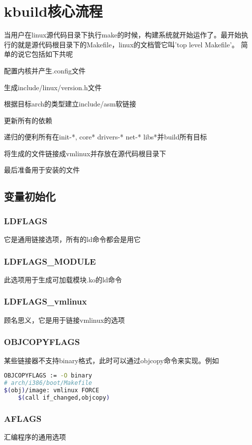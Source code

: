 \section{kbuild核心流程}
当用户在linux源代码目录下执行make的时候，构建系统就开始运作了。最开始执行的就是源代码根目录下的Makefile，linux的文档管它叫'top level Makefile'。
简单的说它包括如下共呢
\begin{compactenum}
\item 配置内核并产生.config文件
\item 生成include/linux/version.h文件
\item 根据目标arch的类型建立include/asm软链接
\item 更新所有的依赖
\item 递归的便利所有在init-*, core* drivers-* net-* libs*并build所有目标
\item 将生成的文件链接成vmlinux并存放在源代码根目录下
\item 最后准备用于安装的文件
\end{compactenum}

\subsection{变量初始化}
\subsubsection{LDFLAGS}
它是通用链接选项，所有的ld命令都会是用它
\subsubsection{LDFLAGS\_MODULE}
此选项用于生成可加载模块.ko的ld命令
\subsubsection{LDFLAGS\_vmlinux}
顾名思义，它是用于链接vmlinux的选项
\subsubsection{OBJCOPYFLAGS}
某些链接器不支持binary格式，此时可以通过objcopy命令来实现。例如
\begin{lstlisting}[language=bash]
OBJCOPYFLAGS := -O binary
# arch/i386/boot/Makefile
$(obj)/image: vmlinux FORCE
    $(call if_changed,objcopy)
\end{lstlisting}
\subsubsection{AFLAGS}
汇编程序的通用选项
